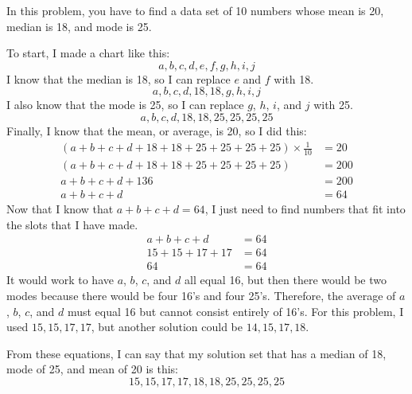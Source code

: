 \documentclass[a4paper]{article}
\begin{document}
In this problem, you have to find a data set of 10 numbers whose mean is 20, median is 18, and mode is 25.

To start, I made a chart like this:
$$a,b,c,d,e,f,g,h,i,j$$
I know that the median is 18, so I can replace $e$ and $f$ with 18.
$$a,b,c,d,18,18,g,h,i,j$$
I also know that the mode is 25, so I can replace $g$, $h$, $i$, and $j$ with 25.
$$a,b,c,d,18,18,25,25,25,25$$
Finally, I know that the mean, or average, is 20, so I did this:
\begin{align*}
(a+b+c+d+18+18+25+25+25+25)\times\frac{1}{10}&=20\\
(a+b+c+d+18+18+25+25+25+25)&=200\\
a+b+c+d+136&=200\\
a+b+c+d&=64
\end{align*}
Now that I know that $a+b+c+d=64$, I just need to find numbers that fit into the slots that I have made.
\begin{align*}
a+b+c+d&=64\\
15+15+17+17&=64\\
64&=64
\end{align*}
It would work to have $a$, $b$, $c$, and $d$ all equal 16, but then there would be two modes because there would be four 16's and four 25's. Therefore, the average of $a$, $b$, $c$, and $d$ must equal 16 but cannot consist entirely of 16's. For this problem, I used $15,15,17,17$, but another solution could be $14,15,17,18$.

From these equations, I can say that my solution set that has a median of 18, mode of 25, and mean of 20 is this:
$$15,15,17,17,18,18,25,25,25,25$$
\end{document}

